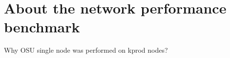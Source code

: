 \chapter{About the network performance benchmark}

Why OSU single node was performed on kprod nodes? 

